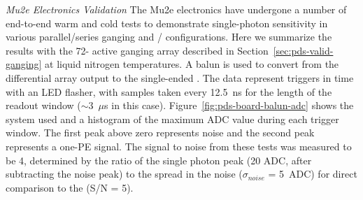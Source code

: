 


\textit{Mu2e Electronics Validation}
The Mu2e electronics have undergone a number of end-to-end warm and cold tests to demonstrate single-photon sensitivity in various parallel/series ganging and / configurations. Here we summarize the results with the 72- active ganging array described in Section~\ref{sec:pds-valid-ganging}
at liquid nitrogen temperatures. 
A balun is used to convert from the differential  array output to the single-ended . The data represent triggers in time with an LED flasher, with samples taken every 12.5~ns for the length of the readout window ($\sim$3~$\mu$s in this case). Figure~\ref{fig:pds-board-balun-adc} shows the system used and a histogram of the maximum ADC value during each trigger window. The first peak above zero represents noise and the second peak represents a one-PE signal. The signal to noise from these tests was measured to be 4, determined by the ratio of the single photon peak (20 ADC, after subtracting the noise peak) to the spread in the noise ($\sigma_{noise}$ = 5~ADC) for direct comparison to the  (S/N = 5).

